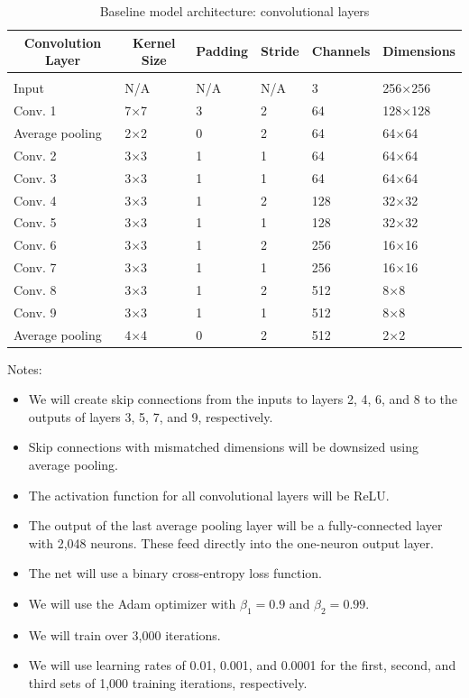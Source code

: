 \documentclass{article} %
\begin{document}
    \begin{table}[t]
    \caption{Baseline model architecture: convolutional layers}
    \label{baseline_arch}
    \begin{center}
    \begin{tabular}{llllll}
    \multicolumn{1}{c}{\bf Convolution Layer}   & \multicolumn{1}{c}{\bf Kernel Size}   & \multicolumn{1}{c}{\bf Padding}    & \multicolumn{1}{c}{\bf Stride}   & \multicolumn{1}{c}{\bf Channels}   & \multicolumn{1}{c}{\bf Dimensions}
    \\ \hline \\
    Input               & N/A   & N/A   & N/A   & 3     & 256×256 \\
    Conv. 1             & 7×7   & 3     & 2     & 64    & 128×128 \\
    Average pooling     & 2×2   & 0     & 2     & 64    & 64×64 \\
    Conv. 2             & 3×3   & 1     & 1     & 64    & 64×64 \\
    Conv. 3             & 3×3   & 1     & 1     & 64    & 64×64 \\
    Conv. 4             & 3×3   & 1     & 2     & 128   & 32×32 \\
    Conv. 5             & 3×3   & 1     & 1     & 128   & 32×32 \\
    Conv. 6             & 3×3   & 1     & 2     & 256   & 16×16 \\
    Conv. 7             & 3×3   & 1     & 1     & 256   & 16×16 \\
    Conv. 8             & 3×3   & 1     & 2     & 512   & 8×8 \\
    Conv. 9             & 3×3   & 1     & 1     & 512   & 8×8 \\
    Average pooling     & 4×4   & 0     & 2     & 512   & 2×2 \\
    \end{tabular}
    \end{center}
    \end{table}

Notes:
\begin{itemize}
    \item We will create skip connections from the inputs to layers 2, 4, 6, and 8 to the outputs of layers 3, 5, 7, and 9, respectively.
    \item Skip connections with mismatched dimensions will be downsized using average pooling.
    \item The activation function for all convolutional layers will be ReLU.
    \item The output of the last average pooling layer will be a fully-connected layer with 2,048 neurons. These feed directly into the one-neuron output layer.
    \item The net will use a binary cross-entropy loss function.
    \item We will use the Adam optimizer with $\beta_1 = 0.9$ and $\beta_2=0.99$.
    \item We will train over 3,000 iterations.
    \item We will use learning rates of 0.01, 0.001, and 0.0001 for the first, second, and third sets of 1,000 training iterations, respectively.
\end{itemize}
\end{document}
